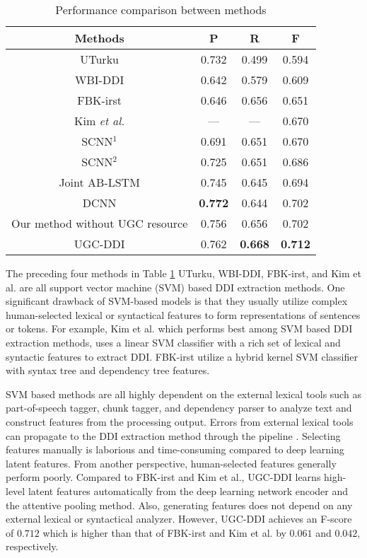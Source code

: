 \documentclass[conference]{IEEEtran}
\begin{document}
\begin{table}
\caption{Performance comparison between methods}
\normalsize
\label{table:comp}
\centering
\begin{tabular}{cccc}
\hline
 Methods & P & R & F \\ \hline
 UTurku \cite{bjorne_uturku:_2013} & 0.732 &  0.499 &  0.594\\
 WBI-DDI \cite{thomas_wbi-ddi:_2013} & 0.642 &  0.579 &  0.609 \\
 FBK-irst \cite{chowdhury_fbk-irst:_2013} &  0.646 & 0.656 & 0.651\\
 Kim \emph{et al.} \cite{kim_extracting_2015} & --- & --- &  0.670\\
  SCNN$^1$ \cite{zhao_drug_2016} &  0.691 & 0.651 & 0.670\\
 SCNN$^2$ \cite{zhao_drug_2016} &  0.725 & 0.651 & 0.686\\
 Joint AB-LSTM \cite{sahu_drug-drug_2017} &  0.745 & 0.645 & 0.694\\
 DCNN \cite{liu_dependency-based_2016} & \textbf{0.772} & 0.644 & 0.702 \\
 Our method without UGC resource & 0.756 & 0.656 & 0.702 \\
 UGC-DDI & 0.762 & \textbf{0.668} & \textbf{0.712} \\\hline
\end{tabular}
\end{table}

The preceding four methods in Table \ref{table:comp} UTurku, WBI-DDI, FBK-irst, and Kim et al. are all support vector machine (SVM) based DDI extraction methods.
One significant drawback of SVM-based models is that they usually utilize complex human-selected lexical or
syntactical features to form representations of sentences or tokens.
For example, Kim et al. which performs best among SVM based DDI extraction methods, uses a linear SVM classifier
with a rich set of lexical and syntactic features to extract DDI.
FBK-irst utilize a hybrid kernel SVM classifier with syntax tree and dependency tree features.

SVM based methods are all highly dependent on the external lexical tools such as part-of-speech tagger,
chunk tagger, and dependency parser to analyze text and construct features from the processing output.
Errors from external lexical tools can propagate to the DDI extraction method through the pipeline \cite{jiao_chinese_2018}.
Selecting features manually is laborious and time-consuming compared to deep learning latent features.
From another perspective, human-selected features generally perform poorly.
Compared to FBK-irst and Kim et al., UGC-DDI learns high-level latent features automatically from the deep learning network encoder
and the attentive pooling method.
Also, generating features does not depend on any external lexical or syntactical analyzer.
However, UGC-DDI achieves an F-score of $0.712$ which is higher than that of FBK-irst and Kim et al. by $0.061$ and $0.042$, respectively.
\end{document}
